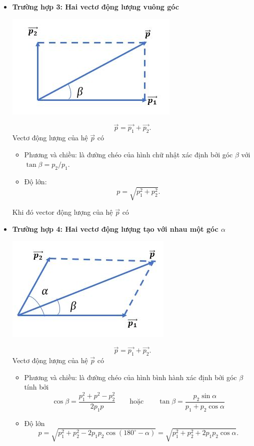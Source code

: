 \begin{itemize}
	\item \textbf{Trường hợp 3: Hai vectơ động lượng vuông góc}
	\begin{center}
		\includegraphics[scale=0.6]{../figs/VN10-PH-29-L-021-2-3.JPG}
	\end{center}
	\begin{equation*}
		\vec {p} = \vec {p_1} + \vec{p_2}.
	\end{equation*}
	Vectơ động lượng của hệ $\vec{p}$ có 
	\begin{itemize}
		\item Phương và chiều: là đường chéo của hình chữ nhật xác định bởi góc $\beta$ với $\tan \beta = {p_2}/{p_1}.$
		\item Độ lớn: $$p = \sqrt {p_1^2+p^2_2}.$$
	\end{itemize}
	Khi đó vector động lượng của hệ $\vec{p}$ có
	
	
	\item \textbf{Trường hợp 4: Hai vectơ động lượng tạo với nhau một góc $\alpha$}
	\begin{center}
		\includegraphics[scale=0.6]{../figs/VN10-PH-29-L-021-2-4.JPG}
	\end{center}
	\begin{equation*}
		\vec {p} = \vec {p_1} + \vec{p_2}.
	\end{equation*}
	Vectơ động lượng của hệ $\vec{p}$ có 
	\begin{itemize}
		\item Phương và chiều: là đường chéo của hình bình hành xác định bởi góc $\beta$ tính bởi 
		\begin{equation*}
			\cos \beta = \dfrac  {p_1^2+p^2-p_2^2}{2p_1p} \qquad\text{hoặc}\qquad
			\tan\beta = \dfrac{p_2\sin\alpha}{p_1+p_2\cos\alpha}
		\end{equation*}
		\item Độ lớn  $$p = \sqrt{p^2_1+p^2_2 - 2p_1p_2 \cos (180^\circ - \alpha)} = \sqrt{p^2_1+p^2_2 + 2p_1p_2 \cos  \alpha}.$$
	\end{itemize}
	

\end{itemize}
